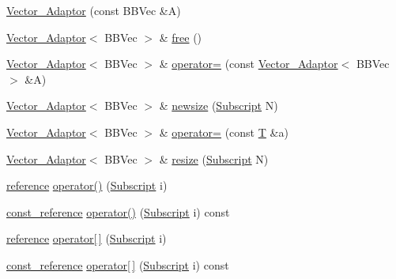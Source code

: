 \begin{DoxyCompactItemize}
\item 
\hyperlink{class_t_n_t_1_1_vector___adaptor_a03a83969ace59fca314aebd6c65fdc12}{Vector\_\-Adaptor} (const BBVec \&A)
\item 
\hyperlink{class_t_n_t_1_1_vector___adaptor}{Vector\_\-Adaptor}$<$ BBVec $>$ \& \hyperlink{class_t_n_t_1_1_vector___adaptor_af612dd8b8f7af56a1b9a0ee63fddc877}{free} ()
\item 
\hyperlink{class_t_n_t_1_1_vector___adaptor}{Vector\_\-Adaptor}$<$ BBVec $>$ \& \hyperlink{class_t_n_t_1_1_vector___adaptor_abbf194ae33c4f0fb2cdcba6ff4f5103f}{operator=} (const \hyperlink{class_t_n_t_1_1_vector___adaptor}{Vector\_\-Adaptor}$<$ BBVec $>$ \&A)
\item 
\hyperlink{class_t_n_t_1_1_vector___adaptor}{Vector\_\-Adaptor}$<$ BBVec $>$ \& \hyperlink{class_t_n_t_1_1_vector___adaptor_a3fdc872f1074a2582f9aeb2c6b5644ff}{newsize} (\hyperlink{namespace_t_n_t_af22e3f1460e145c04ce4e7d701e4c1c1}{Subscript} N)
\item 
\hyperlink{class_t_n_t_1_1_vector___adaptor}{Vector\_\-Adaptor}$<$ BBVec $>$ \& \hyperlink{class_t_n_t_1_1_vector___adaptor_a420f22b8eac6f3e04e213347241422bf}{operator=} (const \hyperlink{class_t_n_t_1_1_vector___adaptor_a8f689dfb94d76130f5327e00f2d10b97}{T} \&a)
\item 
\hyperlink{class_t_n_t_1_1_vector___adaptor}{Vector\_\-Adaptor}$<$ BBVec $>$ \& \hyperlink{class_t_n_t_1_1_vector___adaptor_a26773fcd5f8543c6c5336ee1945a4bd6}{resize} (\hyperlink{namespace_t_n_t_af22e3f1460e145c04ce4e7d701e4c1c1}{Subscript} N)
\item 
\hyperlink{class_t_n_t_1_1_vector___adaptor_a0b32370a0c8d85460988cca7ac36cfca}{reference} \hyperlink{class_t_n_t_1_1_vector___adaptor_a6ba4489c3d7307cff839da64339dbe69}{operator()} (\hyperlink{namespace_t_n_t_af22e3f1460e145c04ce4e7d701e4c1c1}{Subscript} i)
\item 
\hyperlink{class_t_n_t_1_1_vector___adaptor_aa1387887d6104a4256a80106d145afa0}{const\_\-reference} \hyperlink{class_t_n_t_1_1_vector___adaptor_a183ccb954f72251e355f18db787e8e29}{operator()} (\hyperlink{namespace_t_n_t_af22e3f1460e145c04ce4e7d701e4c1c1}{Subscript} i) const 
\item 
\hyperlink{class_t_n_t_1_1_vector___adaptor_a0b32370a0c8d85460988cca7ac36cfca}{reference} \hyperlink{class_t_n_t_1_1_vector___adaptor_a27faf83a6cbc5f5b2b3f39afcd35db55}{operator\mbox{[}$\,$\mbox{]}} (\hyperlink{namespace_t_n_t_af22e3f1460e145c04ce4e7d701e4c1c1}{Subscript} i)
\item 
\hyperlink{class_t_n_t_1_1_vector___adaptor_aa1387887d6104a4256a80106d145afa0}{const\_\-reference} \hyperlink{class_t_n_t_1_1_vector___adaptor_a893095d4b483638ad6ea6545a8d31049}{operator\mbox{[}$\,$\mbox{]}} (\hyperlink{namespace_t_n_t_af22e3f1460e145c04ce4e7d701e4c1c1}{Subscript} i) const 
\end{DoxyCompactItemize}
